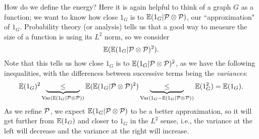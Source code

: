 How do we define the energy? Here it is again helpful to think of a graph $G$ as a function; we want to know how close $1_G$ is to $\E(1_G|\cal P\ot \cal P)$, our ``approximation" of $1_G$.  
Probability theory (or analysis) tells us that a good way to measure the size of a function is using its $L^2$ norm, so we consider
\[
\E(\E(1_G|\cal P\ot \cal P)^2).
\]
Note that this tells us how close $1_G$ is to $\E(1_G|\cal P\ot \cal P)^2$, as we have the following inequalities, with the differences between successive terms being the {\it variances}:
\begin{equation}\label{eq:energy-and-variance}
\E(1_G)^2 \underbrace{\qquad\le\qquad}_{\Var(\E(1_G|\cal P\ot \cal P))}\E(\E(1_G|\cal P\ot \cal P)^2)\underbrace{\qquad\le\qquad}_{\Var(1_G-\E(1_G|\cal P\ot \cal P))}
\E(1_G^2)=\E(1_G).
\end{equation}
%
As we refine $\cal P$, we expect $\E(1_G|\cal P\ot \cal P)$ to be a better approximation, so it will get further from $\E(1_G)$ and closer to $1_G$ in the $L^2$ sense, i.e., the variance at the left will decrease and the variance at the right will increase.\\


